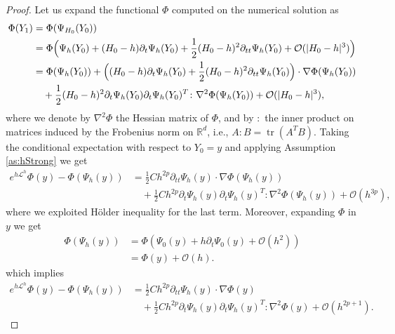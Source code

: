 \documentclass{siamart1116}
\numberwithin{theorem}{section}
\DeclarePairedDelimiter{\abs}{\lvert}{\rvert}
\newcommand{\R}{\mathbb{R}}
\newcommand{\OO}{\mathcal{O}}
\newcommand{\diffL}{\mathcal{L}}
\newcommand{\trace}{\operatorname{tr}}
\begin{document}
\begin{proof} Let us expand the functional $\Phi$ computed on the numerical solution as
	\begin{equation}
		\begin{aligned}
			\Phi(Y_1) &= \Phi(\Psi_{H_0}(Y_0)) \\
			&= \Phi\Big(\Psi_h(Y_0) + (H_0-h)\partial_t\Psi_h(Y_0) + \frac{1}{2}(H_0-h)^2\partial_{tt}\Psi_h(Y_0) + \OO(\abs{H_0 - h}^3)\Big)\\
			&= \Phi(\Psi_h(Y_0)) + \Big((H_0 - h)\partial_t\Psi_h(Y_0)+\frac{1}{2}(H_0-h)^2\partial_{tt}\Psi_h(Y_0)\Big) \cdot \nabla\Phi(\Psi_h(Y_0))\\
			&\quad + \frac{1}{2}(H_0 - h)^2 \partial_t \Psi_h(Y_0) \partial_t \Psi_h(Y_0)^T \colon \nabla^2\Phi(\Psi_h(Y_0)) + \OO(\abs{H_0 - h}^3),
		\end{aligned}
	\end{equation}
	where we denote by $\nabla^2\Phi$ the Hessian matrix of $\Phi$, and by $\colon$ the inner product on matrices induced by the Frobenius norm on $\R^d$, i.e., $A\colon B = \trace(A^TB)$. Taking the conditional expectation with respect to $Y_0 = y$ and applying Assumption \ref{as:hStrong} we get
	\begin{equation}
		\begin{aligned}
			e^{h\diffL^h}\Phi(y) - \Phi(\Psi_h(y)) &= \frac{1}{2} Ch^{2p}\partial_{tt}\Psi_h(y)\cdot \nabla\Phi(\Psi_h(y))\\
			&\quad + \frac{1}{2} Ch^{2p}\partial_t \Psi_h(y) \partial_t \Psi_h(y)^T \colon \nabla^2\Phi(\Psi_h(y)) + \OO(h^{3p}),
		\end{aligned}
	\end{equation}
	where we exploited Hölder inequality for the last term. Moreover, expanding $\Phi$ in $y$ we get
	\begin{equation}
		\begin{aligned}
			\Phi(\Psi_h(y)) &= \Phi\left(\Psi_0(y) + h\partial_t \Psi_0(y) + \OO(h^2)\right) \\
			&= \Phi(y) + \OO(h).
		\end{aligned}
	\end{equation}
	which implies
	\begin{equation}\label{eq:DistanceProbDet}
		\begin{aligned}
			e^{h\diffL^h}\Phi(y) - \Phi(\Psi_h(y)) &= \frac{1}{2} Ch^{2p}\partial_{tt}\Psi_h(y) \cdot \nabla\Phi(y)\\
			&\quad +\frac{1}{2}Ch^{2p}\partial_t \Psi_h(y) \partial_t \Psi_h(y)^T \colon \nabla^2\Phi(y) + \OO(h^{2p+1}).

\end{aligned}
\end{equation}
\end{proof}
\end{document}
